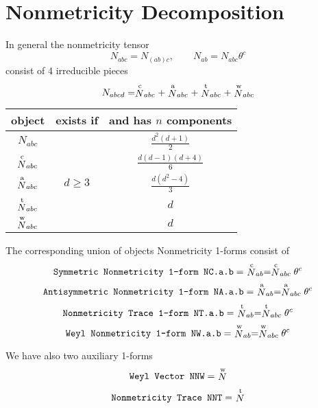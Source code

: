 \documentclass[twoside,openright]{report}
\newcommand{\grgtt}{\ttfamily}
\newcommand{\object}[2]{%
\begin{equation}
\mbox{\comm{#1}} =\ #2
\end{equation}}
\newcommand{\vv}{\vphantom{\rule{5mm}{5mm}}}
\renewcommand{\tt}{\grgtt}
\newcommand{\comm}[1]{{\upshape\tt#1}}    %
\begin{document}
\section{Nonmetricity Decomposition}

In general the nonmetricity tensor
\begin{equation}
N_{abc}=N_{(ab)c},\qquad N_{ab}=N_{abc}\theta^c
\end{equation}
consist of 4 irreducible pieces
\begin{equation}
N_{abcd} =
\stackrel{\rm c}{N}_{abc}
+\stackrel{\rm a}{N}_{abc}
+\stackrel{\rm t}{N}_{abc}
+\stackrel{\rm w}{N}_{abc}
\end{equation}

\begin{center}
\begin{tabular}{|c|c|c|}
\hline object & exists if & and has $n$ components \\
\hline
\vv$N_{abc}$ &  & $\frac{d^2(d+1)}{2}$ \\[1mm]
\hline\vv$\stackrel{\rm c}{N}_{abc}$ &  & $\frac{d(d-1)(d+4)}{6}$ \\
\vv$\stackrel{\rm a}{N}_{abc}$ & $d\geq3$ & $\frac{d(d^2-4)}{3}$ \\
\vv$\stackrel{\rm t}{N}_{abc}$ &  & $d$ \\
\vv$\stackrel{\rm w}{N}_{abc}$ &  & $d$ \\[1mm]
\hline
\end{tabular}
\end{center}

The corresponding union of objects {\tt Nonmetricity 1-forms}
consist of
\object{Symmetric Nonmetricity 1-form      NC.a.b}
{\stackrel{\rm c}{N}_{ab}=\stackrel{\rm c}{N}_{abc}\theta^c}
\object{Antisymmetric Nonmetricity 1-form  NA.a.b}
{\stackrel{\rm a}{N}_{ab}=\stackrel{\rm a}{N}_{abc}\theta^c}
\object{Nonmetricity Trace  1-form         NT.a.b}
{\stackrel{\rm t}{N}_{ab}=\stackrel{\rm t}{N}_{abc}\theta^c}
\object{Weyl Nonmetricity 1-form           NW.a.b}
{\stackrel{\rm w}{N}_{ab}=\stackrel{\rm w}{N}_{abc}\theta^c}

We have also two auxiliary 1-forms
\object{Weyl Vector           NNW}{\stackrel{\rm w}{N}}
\object{Nonmetricity Trace    NNT}{\stackrel{\rm t}{N}}
\end{document}
